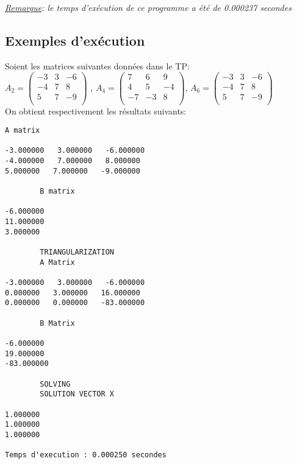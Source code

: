 \textit{\underline{Remarque}: le temps d'exécution de ce programme a été de 0.000237 secondes}
\subsection{Exemples d'exécution}

Soient les matrices suivantes données dans le TP:\\

$A_2 = \begin{pmatrix}
-3 & 3 & -6 \\
-4 & 7 &  8 \\
5 & 7 & -9 \\
\end{pmatrix}
$
,
$A_4 = \begin{pmatrix}
7 & 6 & 9 \\
4 & 5 &  -4\\
-7 & -3 & 8 \\
\end{pmatrix}
$,
$A_6 = \begin{pmatrix}
-3 & 3 & -6 \\
-4 & 7 &  8 \\
5 & 7 & -9 \\
\end{pmatrix}
$
\vspace{12pt}\\
On obtient respectivement les résultats suivants:
\\
\begin{lstlisting}[caption={$A_2X=B$} results, basicstyle=\fontsize{4}{6}\selectfont]
  		A matrix 

-3.000000   3.000000   -6.000000   
-4.000000   7.000000   8.000000   
5.000000   7.000000   -9.000000   

		B matrix 

-6.000000   
11.000000   
3.000000   

		TRIANGULARIZATION
		A Matrix 

-3.000000   3.000000   -6.000000   
0.000000   3.000000   16.000000   
0.000000   0.000000   -83.000000   

		B Matrix 

-6.000000   
19.000000   
-83.000000   

		SOLVING 
		SOLUTION VECTOR X 

1.000000   
1.000000   
1.000000   

Temps d'execution : 0.000250 secondes
\end{lstlisting}
